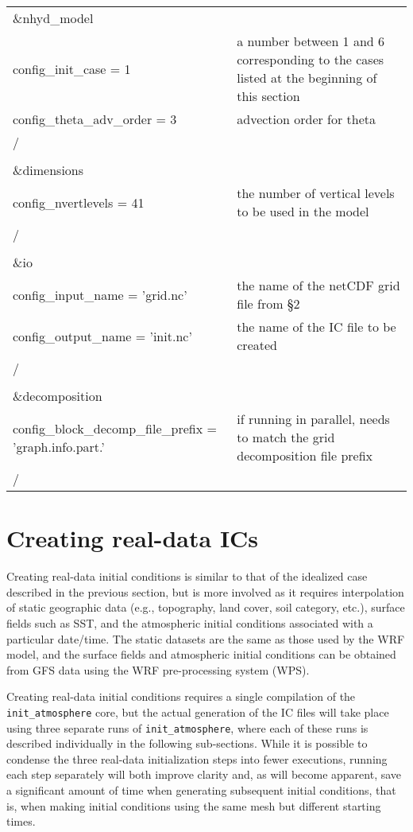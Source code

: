 \begin{longtable}{p{3in}|p{3.25in}}

\&nhyd\_model\\
   config\_init\_case       = 1                      & a number between 1 and 6 corresponding to the cases listed at the beginning of this section\\
   config\_theta\_adv\_order = 3                     & advection order for theta \\
/\\
\\
\&dimensions\\
   config\_nvertlevels     = 41                      & the number of vertical levels to be used in the model \\
/\\
\\
\&io\\
   config\_input\_name         = 'grid.nc'           & the name of the netCDF grid file from \S2 \\
   config\_output\_name        = 'init.nc'           & the name of the IC file to be created \\
/\\
\\
\&decomposition\\
   config\_block\_decomp\_file\_prefix = 'graph.info.part.' & if running in parallel, needs to match the grid decomposition file prefix \\
/\\

\end{longtable}



\section{Creating real-data ICs}

Creating real-data initial conditions is similar to that of the idealized case described in the previous section, but is more involved as it requires interpolation of static geographic data (e.g., topography, land cover, soil category, etc.), surface fields such as SST, and the atmospheric initial conditions associated with a particular date/time.  The static datasets are the same as those used by the WRF model, and the surface fields and atmospheric initial conditions can be obtained from GFS data using the WRF pre-processing system (WPS).

Creating real-data initial conditions requires a single compilation of the {\tt init\_atmosphere} core, but the actual generation of the IC files will take place using three separate runs of {\tt init\_atmosphere}, where each of these runs is described individually in the following sub-sections.  While it is possible to condense the three real-data initialization steps into fewer executions, running each step separately will both improve clarity and, as will become apparent, save a significant amount of time when generating subsequent initial conditions, that is, when making initial conditions using the same mesh but different starting times.

